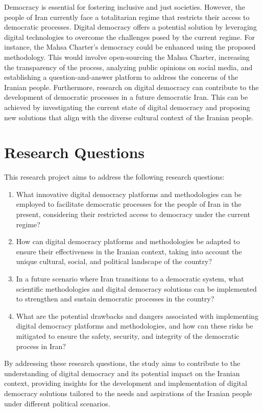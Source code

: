 \documentclass{IEEEtran}
\begin{document}
Democracy is essential for fostering inclusive and just societies. However, the people of Iran currently face a totalitarian regime that restricts their access to democratic processes. Digital democracy offers a potential solution by leveraging digital technologies to overcome the challenges posed by the current regime.
For instance, the Mahsa Charter's democracy could be enhanced using the proposed methodology. This would involve open-sourcing the Mahsa Charter, increasing the transparency of the process, analyzing public opinions on social media, and establishing a question-and-answer platform to address the concerns of the Iranian people.
Furthermore, research on digital democracy can contribute to the development of democratic processes in a future democratic Iran. This can be achieved by investigating the current state of digital democracy and proposing new solutions that align with the diverse cultural context of the Iranian people.

\section{Research Questions}

This research project aims to address the following research questions:

\begin{enumerate}
\item What innovative digital democracy platforms and methodologies can be employed to facilitate democratic processes for the people of Iran in the present, considering their restricted access to democracy under the current regime?
\item How can digital democracy platforms and methodologies be adapted to ensure their effectiveness in the Iranian context, taking into account the unique cultural, social, and political landscape of the country?
\item In a future scenario where Iran transitions to a democratic system, what scientific methodologies and digital democracy solutions can be implemented to strengthen and sustain democratic processes in the country?
\item What are the potential drawbacks and dangers associated with implementing digital democracy platforms and methodologies, and how can these risks be mitigated to ensure the safety, security, and integrity of the democratic process in Iran?
\end{enumerate}

By addressing these research questions, the study aims to contribute to the understanding of digital democracy and its potential impact on the Iranian context, providing insights for the development and implementation of digital democracy solutions tailored to the needs and aspirations of the Iranian people under different political scenarios.
\end{document}
